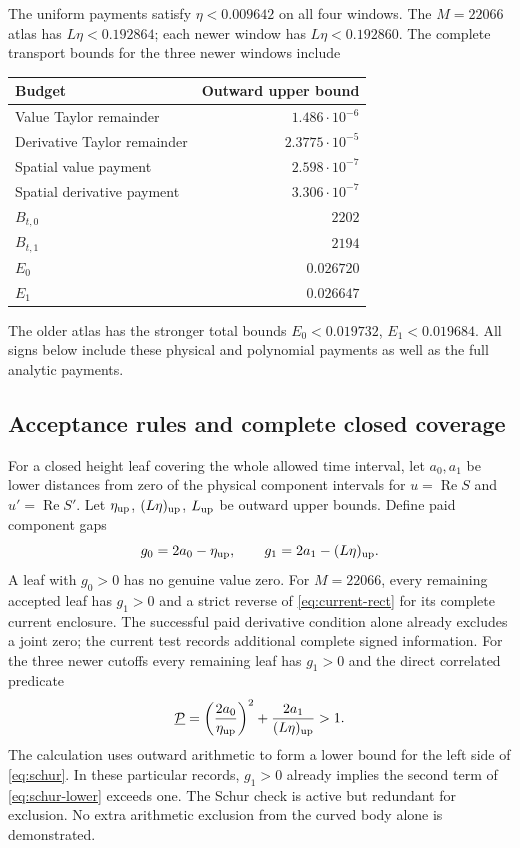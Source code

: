 \documentclass[11pt]{article}
\numberwithin{equation}{section}
\theoremstyle{definition}
\theoremstyle{remark}
\DeclareMathOperator{\Rea}{Re}
\begin{document}
The uniform payments satisfy $\eta<0.009642$ on all four windows.
The $M=22066$ atlas has $L\eta<0.192864$; each newer window has
$L\eta<0.192860$. The complete transport bounds for the three newer
windows include
\begin{center}
\begin{tabular}{lr}
\toprule
Budget & Outward upper bound\\
\midrule
Value Taylor remainder & $1.486\cdot10^{-6}$\\
Derivative Taylor remainder & $2.3775\cdot10^{-5}$\\
Spatial value payment & $2.598\cdot10^{-7}$\\
Spatial derivative payment & $3.306\cdot10^{-7}$\\
$B_{t,0}$ & $2202$\\
$B_{t,1}$ & $2194$\\
$E_0$ & $0.026720$\\
$E_1$ & $0.026647$\\
\bottomrule
\end{tabular}
\end{center}
The older atlas has the stronger total bounds
$E_0<0.019732$, $E_1<0.019684$. All signs below include these
physical and polynomial payments as well as the full analytic payments.

\subsection{Acceptance rules and complete closed coverage}
For a closed height leaf covering the whole allowed time interval,
let $a_0,a_1$ be lower distances from zero of the physical component
intervals for $u=\Rea S$ and $u'=\Rea S'$. Let
$\eta_{\rm up}$, $(L\eta)_{\rm up}$, $L_{\rm up}$ be outward
upper bounds. Define paid component gaps
\begin{equation}
 g_0=2a_0-\eta_{\rm up},\qquad
 g_1=2a_1-(L\eta)_{\rm up}.
 \label{eq:component-gaps}
\end{equation}
A leaf with $g_0>0$ has no genuine value zero. For $M=22066$,
every remaining accepted leaf has $g_1>0$ and a strict reverse of
\eqref{eq:current-rect} for its complete current enclosure.
The successful paid derivative condition alone already excludes a
joint zero; the current test records additional complete signed information.
For the three newer cutoffs every remaining leaf has $g_1>0$ and
the direct correlated predicate
\begin{equation}
 \underline{\mathcal P}
 =\left(\frac{2a_0}{\eta_{\rm up}}\right)^2
                 +\frac{2a_1}{(L\eta)_{\rm up}}>1.
 \label{eq:schur-lower}
\end{equation}
The calculation uses outward arithmetic to form a lower bound for
the left side of \eqref{eq:schur}. In these particular records,
$g_1>0$ already implies the second term of
\eqref{eq:schur-lower} exceeds one. The Schur check is active but
redundant for exclusion. No extra arithmetic exclusion from the curved
body alone is demonstrated.
\end{document}
